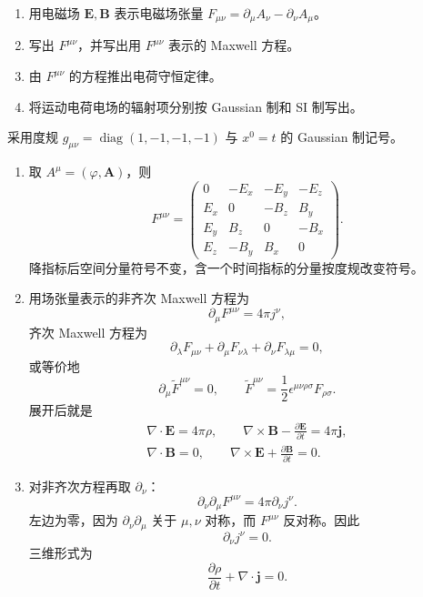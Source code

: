 

\begin{question}
\begin{enumerate}
  \item 用电磁场 $\mathbf E,\mathbf B$ 表示电磁场张量 $F_{\mu\nu}=\partial_\mu A_\nu-\partial_\nu A_\mu$。
  \item 写出 $F^{\mu\nu}$，并写出用 $F^{\mu\nu}$ 表示的 Maxwell 方程。
  \item 由 $F^{\mu\nu}$ 的方程推出电荷守恒定律。
  \item 将运动电荷电场的辐射项分别按 Gaussian 制和 SI 制写出。
\end{enumerate}
\begin{solution}
采用度规 $g_{\mu\nu}=\operatorname{diag}(1,-1,-1,-1)$ 与 $x^0=t$ 的 Gaussian 制记号。
\begin{enumerate}
  \item 取 $A^\mu=(\varphi,\mathbf A)$，则
  \[
    F^{\mu\nu}=\begin{pmatrix}
    0&-E_x&-E_y&-E_z\\
    E_x&0&-B_z&B_y\\
    E_y&B_z&0&-B_x\\
    E_z&-B_y&B_x&0
    \end{pmatrix} .
  \]
  降指标后空间分量符号不变，含一个时间指标的分量按度规改变符号。

  \item 用场张量表示的非齐次 Maxwell 方程为
  \[
    \partial_\mu F^{\mu\nu}=4\pi j^\nu,
  \]
  齐次 Maxwell 方程为
  \[
    \partial_\lambda F_{\mu\nu}+\partial_\mu F_{\nu\lambda}+\partial_\nu F_{\lambda\mu}=0,
  \]
  或等价地
  \[
    \partial_\mu \tilde F^{\mu\nu}=0,
    \qquad
    \tilde F^{\mu\nu}=\frac12\epsilon^{\mu\nu\rho\sigma}F_{\rho\sigma} .
  \]
  展开后就是
  \[
  \begin{gathered}
    \nabla\cdot\mathbf E=4\pi\rho,
    \qquad
    \nabla\times\mathbf B-\frac{\partial\mathbf E}{\partial t}=4\pi\mathbf j,\\
    \nabla\cdot\mathbf B=0,
    \qquad
    \nabla\times\mathbf E+\frac{\partial\mathbf B}{\partial t}=0 .
  \end{gathered}
  \]

  \item 对非齐次方程再取 $\partial_\nu$：
  \[
    \partial_\nu\partial_\mu F^{\mu\nu}=4\pi\partial_\nu j^\nu .
  \]
  左边为零，因为 $\partial_\nu\partial_\mu$ 关于 $\mu,\nu$ 对称，而 $F^{\mu\nu}$ 反对称。因此
  \[
    \boxed{\partial_\nu j^\nu=0} .
  \]
  三维形式为
  \[
    \boxed{\frac{\partial\rho}{\partial t}+\nabla\cdot\mathbf j=0} .
  \]


\end{enumerate}
\end{solution}
\end{question}
